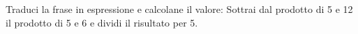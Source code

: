 \item Traduci la frase in espressione e calcolane il valore: Sottrai dal prodotto di 5 e 12 il prodotto di 5 e 6 e dividi il risultato per 5.